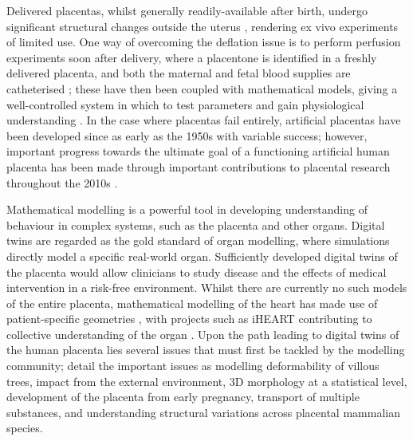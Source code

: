         Delivered placentas, whilst generally readily-available after birth, undergo significant structural changes outside the uterus \cite{lecarpentierComputationalFluidDynamic2016}, rendering ex vivo experiments of limited use. One way of overcoming the deflation issue is to perform perfusion experiments soon after delivery, where a placentone is identified in a freshly delivered placenta, and both the maternal and fetal blood supplies are catheterised \cite{schneiderModifiedDoublecircuitVitro1984,lewisPlacentalPerfusionMathematical2020}; these have then been coupled with mathematical models, giving a well-controlled system in which to test parameters and gain physiological understanding \cite{lewisPlacentalPerfusionMathematical2020}. In the case where placentas fail entirely, artificial placentas have been developed since as early as the 1950s with variable success; however, important progress towards the ultimate goal of a functioning artificial human placenta has been made through important contributions to placental research throughout the 2010s \cite{tunDifferencesPlacentalCapillary2019,saghianAssociationPlacentalJets2017,katoVillousTreeModel2017,serovOptimalVilliDensity2015,serovRoleMorphologyMathematical2016,lecarpentierComputationalFluidDynamic2016,clarkMultiscaleModellingFeto2015,chernyavskyTransportPlacentaHomogenizing2011,chernyavskyMathematicalModelIntervillous2010,burtonRheologicalPhysiologicalConsequences2009,lewisPlacentalPerfusionMathematical2020}.
        
        Mathematical modelling is a powerful tool in developing understanding of behaviour in complex systems, such as the placenta and other organs. Digital twins are regarded as the gold standard of organ modelling, where simulations directly model a specific real-world organ. Sufficiently developed digital twins of the placenta would allow clinicians to study disease and the effects of medical intervention in a risk-free environment. Whilst there are currently no such models of the entire placenta, mathematical modelling of the heart has made use of patient-specific geometries \cite{taoDigitalTwinModeling2022}, with projects such as iHEART contributing to collective understanding of the organ \cite{zingaroComprehensiveMathematicalModel2023}. Upon the path leading to digital twins of the human placenta lies several issues that must first be tackled by the modelling community; \citeauthor{jensenBloodFlowTransport2019} \cite{jensenBloodFlowTransport2019} detail the important issues as modelling deformability of villous trees, impact from the external environment, 3D morphology at a statistical level, development of the placenta from early pregnancy, transport of multiple substances, and understanding structural variations across placental mammalian species.
        
